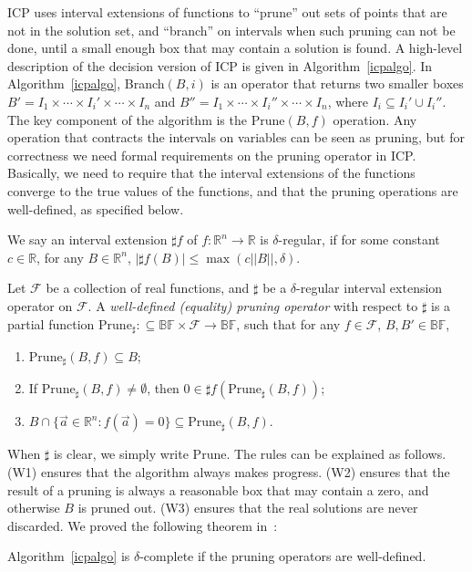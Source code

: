 \documentclass[11pt]{article}
\begin{document}
ICP uses interval extensions of functions to ``prune'' out sets of points that are not in the solution set, and ``branch'' on intervals when such pruning can not be done, until a small enough box that may contain a solution is found. A high-level description of the decision version of ICP is given in Algorithm~\ref{icpalgo}. In Algorithm~\ref{icpalgo}, Branch$(B,i)$ is an operator that returns two smaller boxes $B' = I_1\times\cdots\times I_i'\times\cdots\times I_n$ and $B''=I_1\times \cdots\times I_i''\times \cdots\times I_n$, where $I_i\subseteq I_i'\cup I_i''$. The key component of the algorithm is the $\mathrm{Prune}(B, f)$ operation.  Any operation that contracts the intervals on variables can be seen as pruning, but for correctness we need formal requirements on the pruning operator in ICP.  Basically, we need to require that the interval extensions of the functions converge to the true values of the functions, and that the pruning operations are well-defined, as specified below.  
\begin{definition}
We say an interval extension $\sharp f$ of $f:\mathbb{R}^n\rightarrow \mathbb{R}$ is $\delta$-regular, if for some constant $c\in\mathbb{R}$, for any $B\in \mathbb{R}^n$, $|\sharp f(B)|\leq \max(c||B||, \delta)$. 
\end{definition}
\begin{definition}\label{well}
Let $\mathcal{F}$ be a collection of real functions, and $\sharp$ be a $\delta$-regular interval extension operator on $\mathcal{F}$. A {\em well-defined (equality) pruning operator} with respect to $\sharp$ is a partial function $\mathrm{Prune}_{\sharp} : \subseteq \mathbb{BF}\times \mathcal{F}\rightarrow \mathbb{BF}$, such that for any $f\in \mathcal{F}$, $B,B'\in \mathbb{BF}$,
\begin{enumerate}
\item $\mathrm{Prune}_{\sharp}(B, f)\subseteq B$;
\item If $\mathrm{Prune}_{\sharp}(B,f)\neq \emptyset$, then $0\in \sharp f(\mathrm{Prune}_{\sharp}(B,f))$;
\item $B \cap \{\vec a\in \mathbb{R}^n: f(\vec a)=0\} \subseteq \mathrm{Prune}_{\sharp}(B, f)$.
\end{enumerate}
\end{definition}
When $\sharp$ is clear, we simply write $\mathrm{Prune}$. The rules can be explained as follows. (W1) ensures that the algorithm always makes progress. (W2) ensures that the result of a pruning is always a reasonable box that may contain a zero, and otherwise $B$ is pruned out. (W3) ensures that the real solutions are never discarded. We proved the following theorem in~\cite{DBLP:conf/cade/GaoAC12}:
\begin{theorem}
Algorithm~\ref{icpalgo} is $\delta$-complete if the pruning operators are well-defined. 
\end{theorem}
\end{document}
